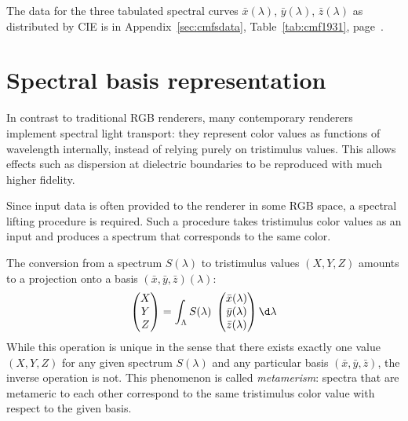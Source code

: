 The data for the three tabulated spectral curves $\bar x(\lambda)$, $\bar
y(\lambda)$, $\bar z(\lambda)$ as distributed by CIE is in
Appendix~\ref{sec:cmfsdata}, Table~\ref{tab:cmf1931},
page~\pageref{tab:cmf1931}.

\section{Spectral basis representation}
\label{sec:spec_basis}

In contrast to traditional RGB renderers, many contemporary renderers implement 
spectral light transport: they represent color values as functions of wavelength
internally, instead of relying purely on tristimulus values.
This allows effects such
as dispersion at dielectric boundaries to be reproduced with much higher fidelity.

Since input data is often provided to the renderer in some \gls{RGB} space,
a spectral lifting procedure is required. Such a procedure takes
tristimulus color values as an input and produces a spectrum that
corresponds to the same color.

The conversion from a spectrum $S(\lambda)$ to tristimulus values 
$(X, Y, Z)$ amounts to a projection onto a basis $(\bar x, \bar y, \bar z)(\lambda)$:
\begin{equation}
    \begin{pmatrix}X\\Y\\Z\end{pmatrix}
        = \int_\Lambda S(\lambda)\; 
    \begin{pmatrix}
        \bar x(\lambda)\\
        \bar y(\lambda)\\
        \bar z(\lambda)
    \end{pmatrix}
    \d\lambda
    \label{eqn:color_matching}
\end{equation}
While this operation is unique in the sense that there exists exactly one
value $(X,Y,Z)$ for any given spectrum $S(\lambda)$ and any particular basis
$(\bar x,\bar y, \bar z)$, the inverse operation is not. This phenomenon is called
\emph{metamerism}: spectra that are metameric to each other correspond to the
same tristimulus color value with respect to the given basis.

